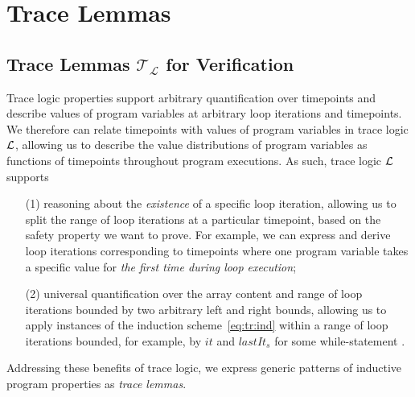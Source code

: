 \section{Trace Lemmas}

\subsection{Trace Lemmas $\mathcal{T_L}$ for Verification}\label{sec:TL}
Trace logic
properties support arbitrary quantification over timepoints and
describe values of program variables at arbitrary loop  iterations and
timepoints. We therefore can relate timepoints with values of program
variables in trace logic $\mathcal{L}$, allowing us to describe the value
distributions of program variables as functions of timepoints
throughout program executions. As such, trace logic $\mathcal{L}$ supports 
\begin{enumerate}
	\item[(1)] reasoning about the {\it existence} of a specific
	loop iteration, allowing us to split the range of loop
	iterations at a particular timepoint, based  on the safety
	property we want to prove. For example, we can express and derive loop iterations
	corresponding to timepoints where one program variable takes
	a specific value for {\it the first time during loop
		execution}; 
	\item[(2)] universal quantification over the array content and
	range of 
	loop iterations bounded by two arbitrary left and right
	bounds, allowing us 
	to apply instances of the induction
	scheme~\eqref{eq:tr:ind} within a range of loop iterations
	bounded, for example, by $it$ and $lastIt_s$ for some while-statement . 
\end{enumerate}
Addressing these benefits of trace logic, we 
express generic patterns of inductive program properties as
\emph{trace lemmas}. %
